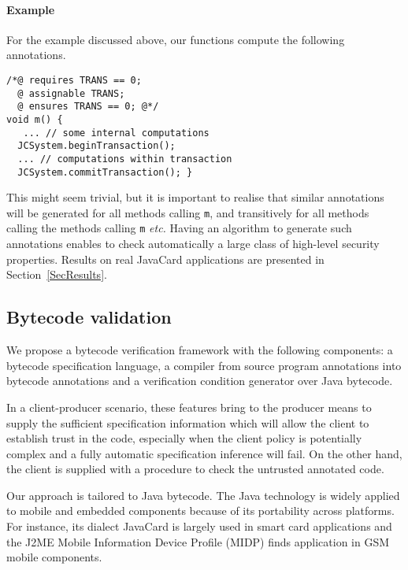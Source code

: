 \paragraph{Example}
For the example discussed above, our functions compute the following
annotations.

\begin{verbatim}
/*@ requires TRANS == 0;
  @ assignable TRANS;
  @ ensures TRANS == 0; @*/
void m() { 
   ... // some internal computations
  JCSystem.beginTransaction();
  ... // computations within transaction
  JCSystem.commitTransaction(); }
\end{verbatim}
This might seem trivial, but it is important to realise that similar
annotations will be generated for all methods calling
\texttt{m}, and transitively for all methods calling the methods
calling \texttt{m} \emph{etc.}
Having an algorithm to generate such annotations enables to check
automatically a large class of high-level security properties.
Results on real JavaCard applications are presented in Section~\ref{SecResults}.

\subsection{Bytecode validation}\label{bytecodesection}
We propose a bytecode verification framework with the following components: a bytecode specification language, a compiler from source
 program annotations into bytecode annotations and a verification condition generator over Java bytecode.

In a client-producer scenario, these features bring to the producer means to supply the sufficient specification information 
which will allow the client to establish trust in the code, especially when the client policy is potentially complex and a fully automatic specification inference
will fail. On the other hand, the client is supplied with a procedure to check the untrusted annotated code. 

Our approach is tailored to Java bytecode.
The Java technology is widely applied to mobile and embedded components because of its portability across platforms. 
For instance, its dialect JavaCard is largely used in smart card applications and the J2ME Mobile Information Device Profile 
(MIDP) finds application in GSM mobile components. 


